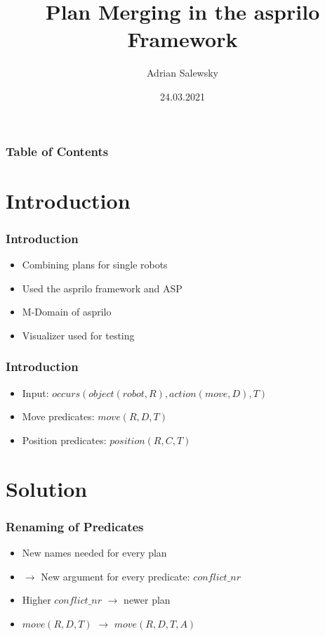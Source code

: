 \documentclass{beamer}
\title{Plan Merging in the asprilo Framework}
\author[Adrian Salewsky]{Adrian Salewsky}
\institute{University of Potsdam}
\date{24.03.2021}
\begin{document}
\frame{\titlepage}

\begin{frame}
\frametitle{Table of Contents}
\tableofcontents
\end{frame}

\section{Introduction} 
\begin{frame}
\frametitle{Introduction}
\begin{itemize}
\item<2-> Combining plans for single robots
\medskip
\item<3-> Used the asprilo framework and ASP
\medskip
\item<4-> M-Domain of asprilo
\medskip
\item<5-> Visualizer used for testing
\end{itemize}
\end{frame}

\begin{frame}
\frametitle{Introduction}
\begin{itemize}
\item<2-> Input: $occurs(object(robot,R),action(move,D),T)$
\bigskip
\item<3-> Move predicates: $move(R,D,T)$
\bigskip
\item<4-> Position predicates: $position(R,C,T)$
\end{itemize}
\end{frame}


\section{Solution}
\begin{frame}
\frametitle{Renaming of Predicates}
\begin{itemize}
\item<2-> New names needed for every plan
\bigskip
\item<3-> $\rightarrow$ New argument for every predicate: $conflict\_nr$ 
\bigskip
\item<4-> Higher $conflict\_nr$ $\rightarrow$ newer plan
\bigskip
\item<5-> $move(R,D,T)$ $\rightarrow$ $move(R,D,T,A)$
\end{itemize}
\end{frame}
\end{document}
